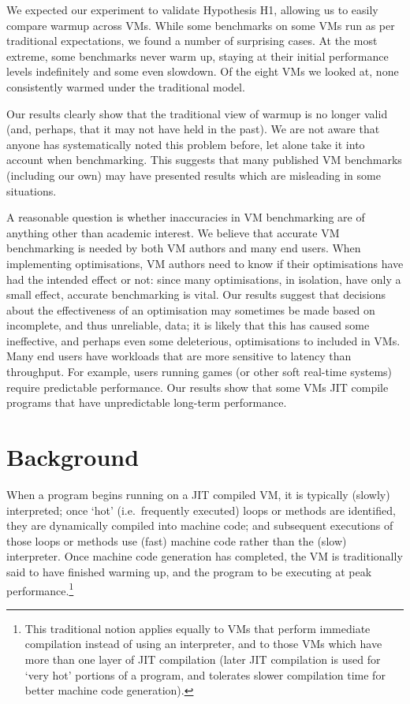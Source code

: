 \documentclass[a4paper,UKenglish]{lipics}
\begin{document}
We expected our experiment to validate Hypothesis H1, allowing us to
easily compare warmup across VMs. While some benchmarks on some VMs run as per
traditional expectations, we found a number of surprising cases. At
the most extreme, some benchmarks never warm up, staying at their initial performance
levels indefinitely and some even slowdown. Of the eight
VMs we looked at, none consistently warmed under the traditional model.

Our results clearly show that the traditional view of warmup is no longer valid (and, perhaps,
that it may not have held in the past). We are not aware that anyone has systematically noted this
problem before, let alone take it into account when benchmarking. This suggests
that many published VM benchmarks (including our own) may have presented
results which are misleading in some situations.

A reasonable question is whether inaccuracies in VM benchmarking are of anything
other than academic interest. We believe that accurate VM benchmarking is needed
by both VM authors and many end users. When
implementing optimisations, VM authors need to know if their optimisations have
had the intended effect or not: since many optimisations, in isolation, have only a
small effect, accurate benchmarking is vital. Our results suggest that decisions
about the effectiveness of an optimisation may sometimes be made based on
incomplete, and thus unreliable, data; 
it is likely that this has caused some ineffective, and perhaps even some deleterious,
optimisations to included in VMs. Many end users have workloads that are more
sensitive to latency than throughput. For example, users running games (or other
soft real-time systems) require predictable performance. Our results show that some
VMs JIT compile programs that have unpredictable long-term performance.

%


\section{Background}
\label{sec:warmup}

When a program begins running on a JIT compiled VM, it is typically (slowly)
interpreted; once `hot' (i.e.~frequently executed) loops or methods are
identified, they are dynamically compiled into machine code; and subsequent
executions of those loops or methods use (fast) machine code rather than the
(slow) interpreter. Once machine code generation has completed, the VM is
traditionally said to have finished warming up, and the program to be executing
at peak performance.\footnote{This traditional notion applies equally to VMs
that perform immediate compilation instead of using an interpreter, and to
those VMs which have more than one layer of JIT compilation (later JIT
compilation is used for `very hot' portions of a program, and tolerates slower
compilation time for better machine code generation).}
\end{document}

